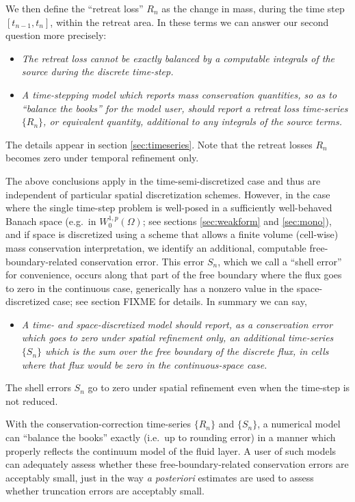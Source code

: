 \documentclass[final,leqno,onefignum,onetabnum]{siamltex1213bueler}
\begin{document}
We then define the ``retreat loss'' $R_n$ as the change in mass, during the time step $[t_{n-1},t_n]$, within the retreat area.  In these terms we can answer our second question more precisely:
\begin{itemize}
\item  \emph{The retreat loss cannot be exactly balanced by a computable integrals of the source during the discrete time-step.}
\item  \emph{A time-stepping model which reports mass conservation quantities, so as to ``balance the books'' for the model user, should report a retreat loss time-series $\{R_n\}$, or equivalent quantity, additional to any integrals of the source terms.}
\end{itemize}
The details appear in section \ref{sec:timeseries}.  Note that the retreat losses $R_n$ becomes zero under temporal refinement only.

The above conclusions apply in the time-semi-discretized case and thus are independent of particular spatial discretization schemes.  However, in the case where the single time-step problem is well-posed in a sufficiently well-behaved Banach space (e.g.~in $W_0^{1,p}(\Omega)$; see sections \ref{sec:weakform} and \ref{sec:mono}), and if space is discretized using a scheme that allows a finite volume (cell-wise) mass conservation interpretation, we identify an additional, computable free-boundary-related conservation error.  This error $S_n$, which we call a ``shell error'' for convenience, occurs along that part of the free boundary where the flux goes to zero in the continuous case, generically has a nonzero value in the space-discretized case; see section FIXME for details.  In summary we can say,
\begin{itemize}
\item  \emph{A time- and space-discretized model should report, as a conservation error which goes to zero under spatial refinement only, an additional time-series $\{S_n\}$ which is the sum over the free boundary of the discrete flux, in cells where that flux would be zero in the continuous-space case.}
\end{itemize}
The shell errors $S_n$ go to zero under spatial refinement even when the time-step is not reduced.

With the conservation-correction time-series $\{R_n\}$ and $\{S_n\}$, a numerical model can ``balance the books'' exactly (i.e.~up to rounding error) in a manner which properly reflects the continuum model of the fluid layer.  A user of such models can adequately assess whether these free-boundary-related conservation errors are acceptably small, just in the way \emph{a posteriori} estimates are used to assess whether truncation errors are acceptably small.
\end{document}
